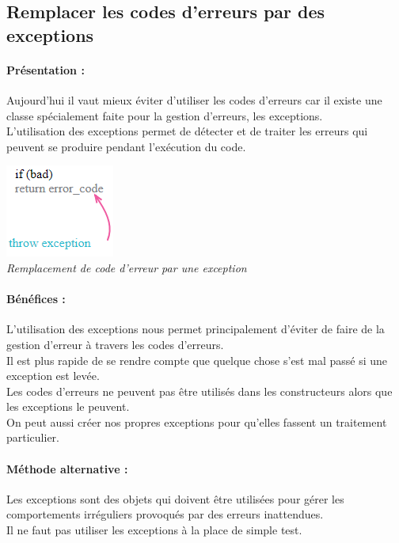 \documentclass[a4paper,twoside,12pt,openright]{report}
\begin{document}
\subsection{Remplacer les codes d'erreurs par des exceptions}
\paragraph{Présentation :}
Aujourd'hui il vaut mieux éviter d'utiliser les codes d'erreurs car il existe une classe spécialement faite pour la gestion d'erreurs, les exceptions.\\
L'utilisation des exceptions permet de détecter et de traiter les erreurs qui peuvent se produire pendant l'exécution du code.\\

\begin{center}
\includegraphics[scale=1]{Image/ThrowException.png}\\
\itshape{Remplacement de code d'erreur par une exception \cite{ref8}}
\end{center}

\paragraph{Bénéfices :}
L'utilisation des exceptions nous permet principalement d'éviter de faire de la gestion d'erreur à travers les codes d'erreurs.\\
Il est plus rapide de se rendre compte que quelque chose s'est mal passé si une exception est levée.\\
Les codes d'erreurs ne peuvent pas être utilisés dans les constructeurs alors que les exceptions le peuvent.\\
On peut aussi créer nos propres exceptions pour qu'elles fassent un traitement particulier.\\

\paragraph{Méthode alternative :}
Les exceptions sont des objets qui doivent être utilisées pour gérer les comportements irréguliers provoqués par des erreurs inattendues.\\
Il ne faut pas utiliser les exceptions à la place de simple test.\\
\end{document}
